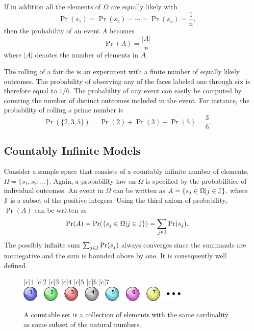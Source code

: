 If in addition all the elements of $\Omega$ are equally likely with
\begin{equation*}
\Pr (s_1) = \Pr (s_2) = \cdots = \Pr (s_n) = \frac{1}{n} ,
\end{equation*}
then the probability of an event $A$ becomes
\begin{equation} \label{equation:ProbEquiProbableOutcomes}
\Pr (A) = \frac{ |A| }{n}
\end{equation}
where $|A|$ denotes the number of elements in $A$.

\begin{example}
The rolling of a fair die is an experiment with a finite number of equally likely outcomes.
The probability of observing any of the faces labeled one through six is therefore equal to $1/6$.
The probability of any event can easily be computed by counting the number of distinct outcomes included in the event.
For instance, the probability of rolling a prime number is
\begin{equation*}
\Pr ( \{ 2, 3, 5 \} )
= \Pr (2) + \Pr(3) + \Pr(5) = \frac{3}{6} .
\end{equation*}
\end{example}


\subsection{Countably Infinite Models}

Consider a sample space that consists of a countably infinite number of elements, $\Omega = \{ s_1, s_2, \ldots \}$.
Again, a probability law on $\Omega$ is specified by the probabilities of individual outcomes.
An event in $\Omega$ can be written as $A = \{ s_j \in \Omega | j \in \mathbb{J} \}$, where $\mathbb{J}$ is a subset of the positive integers.
Using the third axiom of probability, $\Pr (A)$ can be written as
\begin{equation*}
\Pr (A)
= \Pr ( \{ s_j \in \Omega | j \in \mathbb{J} \} )
= \sum_{j \in \mathbb{J}} \Pr (s_j) .
\end{equation*}
The possibly infinite sum $\sum_{j \in \mathbb{J}} \Pr (s_j)$ always converges since the summands are nonnegative and the sum is bounded above by one.
It is consequently well defined.

\begin{figure}[htb!]
\begin{center}
\begin{psfrags}
[c]{$1$}
[c]{$2$}
[c]{$3$}
[c]{$4$}
[c]{$5$}
[c]{$6$}
[c]{$7$}
\includegraphics[height=0.765cm]{Figures/2Chapter/countablespace}
\end{psfrags}
\caption{A countable set is a collection of elements with the same cardinality as some subset of the natural numbers.}
\end{center}
\end{figure}

